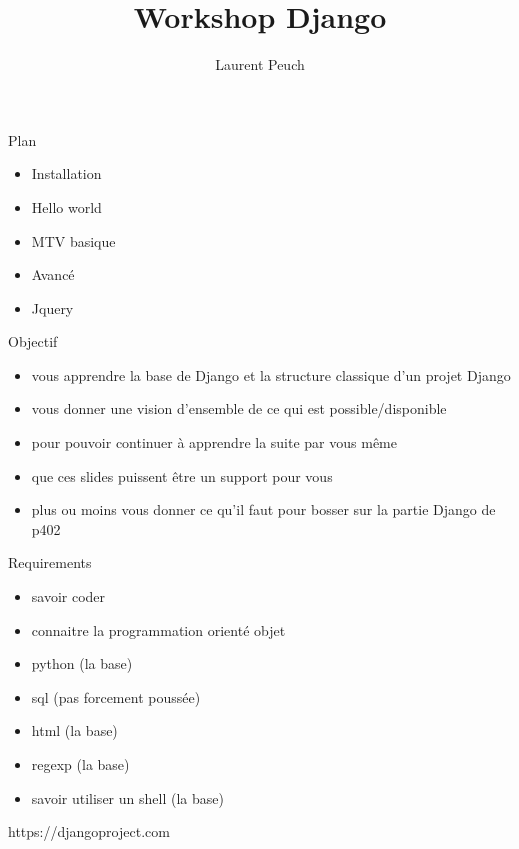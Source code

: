 \documentclass{beamer}
\begin{document}
\title{Workshop Django}
\author{Laurent Peuch}

\maketitle{}

\begin{frame}{Plan}
    \begin{itemize}
        \item Installation
        \item Hello world
        \item MTV basique
        \item Avancé
        \item Jquery
    \end{itemize}
\end{frame}

\begin{frame}{Objectif}
\begin{itemize}
    \item vous apprendre la base de Django et la structure classique d'un projet Django
    \item vous donner une vision d'ensemble de ce qui est possible/disponible
    \item pour pouvoir continuer à apprendre la suite par vous même
    \item que ces slides puissent être un support pour vous
    \item plus ou moins vous donner ce qu'il faut pour bosser sur la partie Django de p402
\end{itemize}
\end{frame}

\begin{frame}{Requirements}
\begin{itemize}
    \item savoir coder
    \item connaitre la programmation orienté objet
    \item python (la base)
    \item sql (pas forcement poussée)
    \item html (la base)
    \item regexp (la base)
    \item savoir utiliser un shell (la base)
\end{itemize}
\end{frame}

\begin{frame}[fragile]{}
    \LARGE \begin{center}https://djangoproject.com\end{center}
\end{frame}
\end{document}
